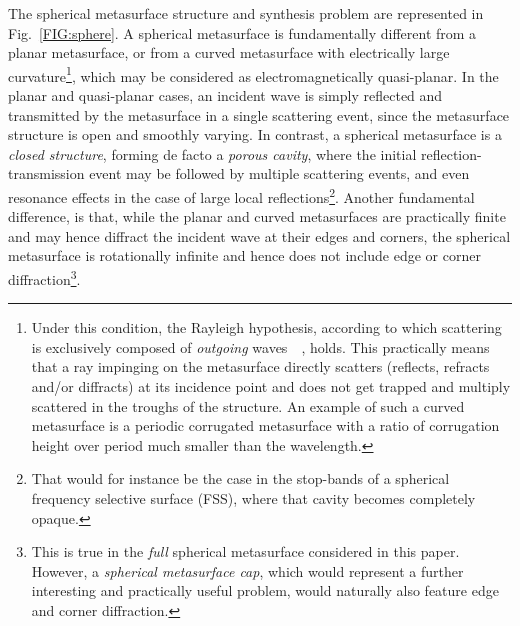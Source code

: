 \documentclass[journal,transaction]{IEEEtran}
\begin{document}
The spherical metasurface structure and synthesis problem are represented in Fig.~\ref{FIG:sphere}. A spherical metasurface is fundamentally different from a planar metasurface, or from a curved metasurface with electrically large curvature\footnote{Under this condition, the Rayleigh hypothesis, according to which scattering is exclusively composed of \emph{outgoing} waves~\cite{Rayleigh_hypothesis}~\cite{rayleigh1896theory}, holds. This practically means that a ray impinging on the metasurface directly scatters (reflects, refracts and/or diffracts) at its incidence point and does not get trapped and multiply scattered in the troughs of the structure. An example of such a curved metasurface is a periodic corrugated metasurface with a ratio of corrugation height over period much smaller than the wavelength.\label{footnote:Rayleigh}}, which may be considered as electromagnetically quasi-planar. In the planar and quasi-planar cases, an incident wave is simply reflected and transmitted by the metasurface in a single scattering event, since the metasurface structure is open and smoothly varying. In contrast, a spherical metasurface is a \emph{closed structure}, forming de facto a \emph{porous cavity}, where the initial reflection-transmission event may be followed by multiple scattering events, and even resonance effects in the case of large local reflections\footnote{That would for instance be the case in the stop-bands of a spherical frequency selective surface (FSS), where that cavity becomes completely opaque.}. Another fundamental difference, is that, while the planar and curved metasurfaces are practically finite and may hence diffract the incident wave at their edges and corners, the spherical metasurface is rotationally infinite and hence does not include edge or corner diffraction\footnote{This is true in the \emph{full} spherical metasurface considered in this paper. However, a \emph{spherical metasurface cap}, which would represent a further interesting and practically useful problem, would naturally also feature edge and corner diffraction.}.
\end{document}
